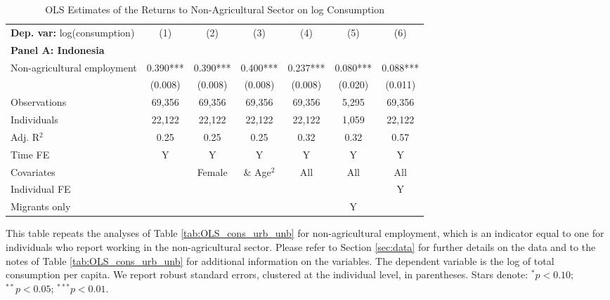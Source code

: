 \begin{table}[htbp] \centering \begin{threeparttable}
 \caption{OLS Estimates of the Returns to Non-Agricultural Sector on log Consumption} 
 \label{tab:OLS_cons_nonag_unb} 
\begin{tabular}{l cccccc} \toprule  \textbf{Dep. var:}  log(consumption) 
                    &\multicolumn{1}{c}{(1)}   &\multicolumn{1}{c}{(2)}   &\multicolumn{1}{c}{(3)}   &\multicolumn{1}{c}{(4)}   &\multicolumn{1}{c}{(5)}   &\multicolumn{1}{c}{(6)}   \\
\textbf{Panel A: Indonesia} \\
Non-agricultural employment&       0.390***&       0.390***&       0.400***&       0.237***&       0.080***&       0.088***\\
                    &     (0.008)   &     (0.008)   &     (0.008)   &     (0.008)   &     (0.020)   &     (0.011)   \\
\addlinespace
Observations        &      69,356   &      69,356   &      69,356   &      69,356   &       5,295   &      69,356   \\
Individuals         &      22,122   &      22,122   &      22,122   &      22,122   &       1,059   &      22,122   \\
Adj. R$^{2}$        &        0.25   &        0.25   &        0.25   &        0.32   &        0.32   &        0.57   \\
\cmidrule{2 -7} Time FE & Y & Y & Y & Y & Y & Y \\ Covariates & & Female & \& Age$^2$ & All & All & All \\ Individual FE & & & & & & Y \\ Migrants only & & & & & Y & \\ \bottomrule \end{tabular} \begin{tablenotes}[flushleft] \footnotesize \item{This table repeats the analyses of Table \ref{tab:OLS_cons_urb_unb}  for non-agricultural employment, which is an indicator equal to one for individuals who report working in the non-agricultural sector. Please refer to Section \ref{sec:data} for further details on the data and to the notes of Table \ref{tab:OLS_cons_urb_unb} for additional information on the variables. The dependent variable is the log of total consumption per capita. We report robust standard errors, clustered at the individual level, in parentheses. Stars denote: $^{*} p<0.10$; $^{**} p<0.05$; $^{***} p<0.01$.} \end{tablenotes} \end{threeparttable} \end{table}
